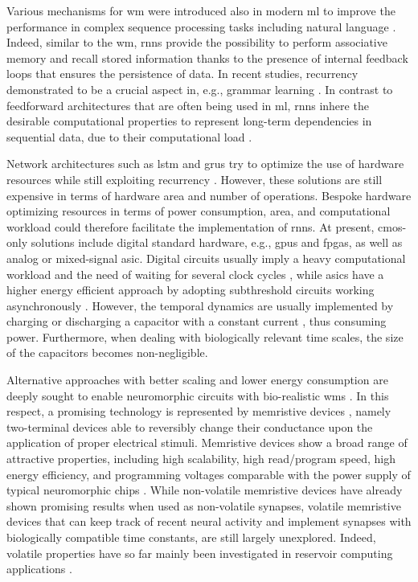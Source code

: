 Various mechanisms for \gls{wm} were introduced also in modern \gls{ml} to improve the performance in complex sequence processing tasks including natural language \cite{weston2014memory, graves2014neural, vinyals2015pointer, santoro2016meta}. Indeed, similar to the \gls{wm}, \glspl{rnn} provide the possibility to perform associative memory and recall stored information thanks to the presence of internal feedback loops that ensures the persistence of data. In recent studies, recurrency demonstrated to be a crucial aspect in, e.g., grammar learning \cite{alamia2020SciRep}. In contrast to feedforward architectures that are often being used in \gls{ml}, \glspl{rnn} inhere the desirable computational properties to represent long-term dependencies in sequential data, due to their computational load \cite{dehghani2018universal, schafer2006recurrent}.

Network architectures such as \gls{lstm} and \glspl{gru} try to optimize the use of hardware resources while still exploiting recurrency \cite{yu2019NeurComp}. However, these solutions are still expensive in terms of hardware area and number of operations. Bespoke hardware optimizing resources in terms of power consumption, area, and computational workload could therefore facilitate the implementation of \glspl{rnn}. At present, \gls{cmos}-only solutions include digital standard hardware, e.g., \glspl{gpu} and \glspl{fpga}, as well as analog or mixed-signal \gls{asic}. Digital circuits usually imply a heavy computational workload and the need of waiting for several clock cycles \cite{amirsoleimani2020AdvIntellSys}, while \glspl{asic} have a higher energy efficient approach by adopting subthreshold circuits working asynchronously \cite{rahimi2020AdvIntellSys}. However, the temporal dynamics are usually implemented by charging or discharging a capacitor with a constant current \cite{chicca2014ProcIEEE}, thus consuming power. Furthermore, when dealing with biologically relevant time scales, the size of the capacitors becomes non-negligible.

Alternative approaches with better scaling and lower energy consumption are deeply sought to enable neuromorphic circuits with bio-realistic \glspl{wm} \cite{covi2021FrontNeurosci}. In this respect, a promising technology is represented by memristive devices \cite{christensen2022NCE}, namely two-terminal devices able to reversibly change their conductance upon the application of proper electrical stimuli. Memristive devices show a broad range of attractive properties, including high scalability, high read/program speed, high energy efficiency, and programming voltages comparable with the power supply of typical neuromorphic chips \cite{kuzum2013Nanotech,ielmini2019Nanotech}. While non-volatile memristive devices have already shown promising results when used as non-volatile synapses, volatile memristive devices that can keep track of recent neural activity and implement synapses with biologically compatible time constants, are still largely unexplored. Indeed, volatile properties have so far mainly been investigated in reservoir computing applications \cite{du2017NatComm,midya2019AdvIntellSys,zhong2021NatComm}.

